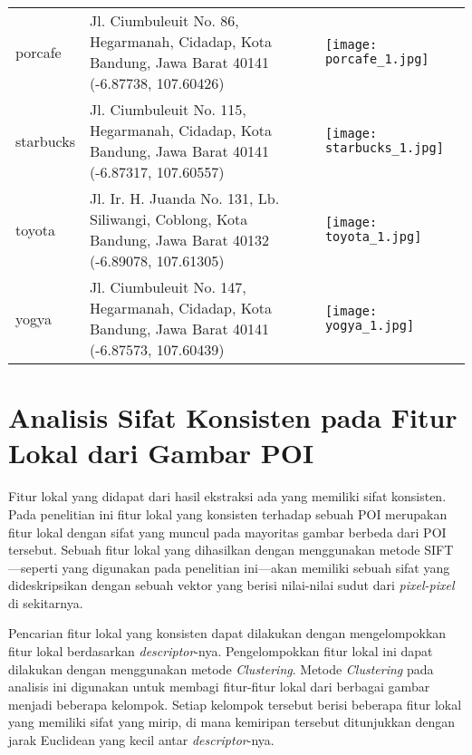 \begin{longtable}{|p{}|p{}|p{}|}
\begin{minipage}{.4\textwidth}
	\end{minipage} \\
	\hline
	porcafe & Jl. Ciumbuleuit No. 86, Hegarmanah, Cidadap, Kota Bandung, Jawa Barat 40141 (-6.87738, 107.60426) & \begin{minipage}{.4\textwidth}
		\vspace{5pt} \texttt{[image: porcafe\_1.jpg]}
	\end{minipage} \\
	\hline
	starbucks & Jl. Ciumbuleuit No. 115, Hegarmanah, Cidadap, Kota Bandung, Jawa Barat 40141 (-6.87317, 107.60557) & \begin{minipage}{.4\textwidth}
		\vspace{5pt} \texttt{[image: starbucks\_1.jpg]}
	\end{minipage} \\
	\hline
	toyota & Jl. Ir. H. Juanda No. 131, Lb. Siliwangi, Coblong, Kota Bandung, Jawa Barat 40132 (-6.89078, 107.61305) & \begin{minipage}{.4\textwidth}
		\vspace{5pt} \texttt{[image: toyota\_1.jpg]}
	\end{minipage} \\
	\hline
	yogya & Jl. Ciumbuleuit No. 147, Hegarmanah, Cidadap, Kota Bandung, Jawa Barat 40141 (-6.87573, 107.60439) & \begin{minipage}{.4\textwidth}
		\vspace{5pt} \texttt{[image: yogya\_1.jpg]}
	\end{minipage} \\
	\hline
\end{longtable}


\section{Analisis Sifat Konsisten pada Fitur Lokal dari Gambar POI}
\label{sec:analisis_konsistensi}
Fitur lokal yang didapat dari hasil ekstraksi ada yang memiliki sifat konsisten. Pada penelitian ini fitur lokal yang konsisten terhadap sebuah POI merupakan fitur lokal dengan sifat yang muncul pada mayoritas gambar berbeda dari POI tersebut. Sebuah fitur lokal yang dihasilkan dengan menggunakan metode SIFT ---seperti yang digunakan pada penelitian ini---akan memiliki sebuah sifat yang dideskripsikan dengan sebuah vektor yang berisi nilai-nilai sudut dari \textit{pixel-pixel} di sekitarnya. 

Pencarian fitur lokal yang konsisten dapat dilakukan dengan mengelompokkan fitur lokal berdasarkan \textit{descriptor}-nya. Pengelompokkan fitur lokal ini dapat dilakukan dengan menggunakan metode \textit{Clustering}. Metode \textit{Clustering} pada analisis ini digunakan untuk membagi fitur-fitur lokal dari berbagai gambar menjadi beberapa kelompok. Setiap kelompok tersebut berisi beberapa fitur lokal yang memiliki sifat yang mirip, di mana kemiripan tersebut ditunjukkan dengan jarak Euclidean yang kecil antar \textit{descriptor}-nya. 

